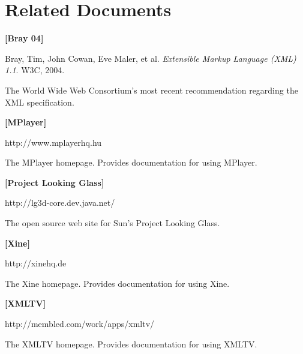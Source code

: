 \documentclass[letterpaper, titlepage, 11pt]{article}
\begin{document}
\section{Related Documents}
\begin{list}{}{
\setlength{\parsep}{1ex}
\setlength{\leftmargin}{0.5in}
\setlength{\itemindent}{-0.5in}
}

\item[] \textbf{[Bray 04]}

	Bray, Tim, John Cowan, Eve Maler, et al. \textit{Extensible Markup
	Language (XML) 1.1}. W3C, 2004.

	The World Wide Web Consortium's most recent recommendation regarding the
	XML specification.

\item[] \textbf{[MPlayer]}

	http://www.mplayerhq.hu

	The MPlayer homepage.  Provides documentation for using MPlayer.

\item[] \textbf{[Project Looking Glass]}

	http://lg3d-core.dev.java.net/

	The open source web site for Sun's Project Looking Glass.

\item[] \textbf{[Xine]}

	http://xinehq.de

	The Xine homepage.  Provides documentation for using Xine.

\item[] \textbf{[XMLTV]}

	http://membled.com/work/apps/xmltv/

	The XMLTV homepage.  Provides documentation for using XMLTV.

\end{list}
\end{document}
